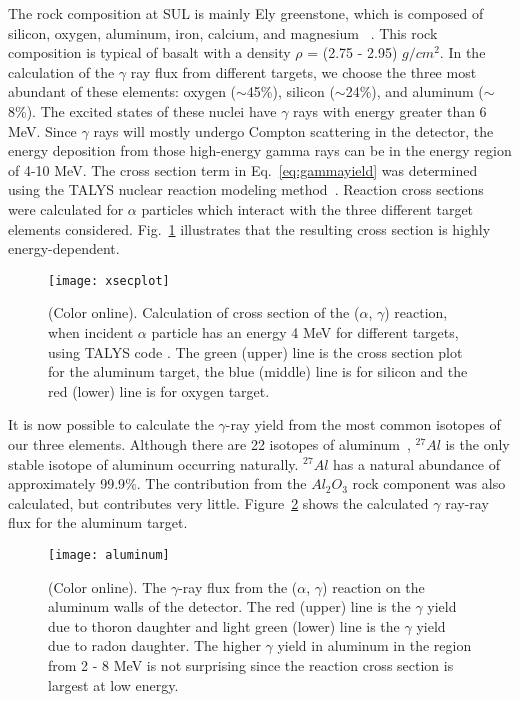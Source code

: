 \documentclass[aps,prc,showpacs,twocolumn,superscriptaddress]{revtex4-1}
\begin{document}
The rock composition at SUL is mainly Ely greenstone, which is composed of silicon, oxygen, aluminum, iron, calcium, and magnesium ~\cite{ruddick, rock}.  This rock composition is typical of basalt with a density $\rho$ = (2.75 - 2.95) $g/cm^2$.  In the calculation of the $\gamma$ ray flux from different targets, we choose the three most abundant of these elements: oxygen ($\sim$45\%), silicon ($\sim$24\%), and aluminum ($\sim$8\%). The excited states of these nuclei have $\gamma$ rays with energy greater than 6 MeV. Since $\gamma$ rays will mostly undergo Compton scattering in the detector, the energy deposition from those high-energy gamma rays can be in the energy region of 4-10 MeV. The cross section term in Eq.~\ref{eq:gammayield} was determined using the TALYS nuclear reaction modeling method~\cite{talys}.  Reaction cross sections were calculated for $\alpha$ particles which interact with the three different target elements considered. Fig.~\ref{fig:cross_sec} illustrates that the resulting cross section is highly energy-dependent. 
\begin{figure}[H]
\centering
\texttt{[image: xsecplot]}
\caption{(Color online). Calculation of cross section of the ($\alpha$, $\gamma$) reaction, when incident $\alpha$ particle has an energy 4 MeV for different targets, using TALYS code \cite{talys}. The green (upper) line is the cross section plot for the aluminum target, the blue (middle) line is for silicon and the red (lower) line is for oxygen target.} 
\label{fig:cross_sec}
\end{figure}

It is now possible to calculate the $\gamma$-ray yield from the most common isotopes of our three elements.  Although there are 22 isotopes of aluminum~\cite{isotop}, $^{27}Al$ is the only stable isotope of aluminum occurring naturally. $^{27}Al$ has a natural abundance of approximately 99.9$\%$.  The contribution from the $Al_{2}O_{3}$ rock component was also calculated, but contributes very little. Figure~\ref{fig:alu_gamma_yield} shows the calculated $\gamma$ ray-ray flux for the aluminum target. 
\begin{figure}[H]
\centering
\texttt{[image: aluminum]}
\caption{(Color online). The $\gamma$-ray flux from the ($\alpha$, $\gamma$) reaction on the aluminum walls of the detector. The red (upper) line is the $\gamma$ yield due to thoron daughter and light green (lower) line is the $\gamma$ yield due to radon daughter.  The higher $\gamma$ yield in aluminum in the region from 2 - 8 MeV is not surprising since the reaction cross section is largest at low energy.} 
\label{fig:alu_gamma_yield}
\end{figure}
\end{document}
